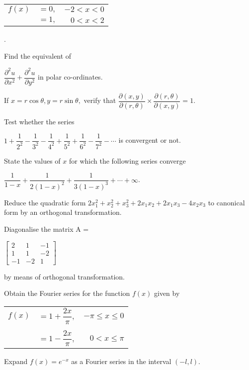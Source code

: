   \begin{tabular}{l@{} @{}c @{}  r}
    $f(x)$ & $= 0,$ & $-2<x<0$\\
    & $= 1,$ & $0<x<2$
  \end{tabular}.

\markB

\newpage \again 

\partCo

\item \iitem Find the equivalent of

\hspace{1cm}  $\dfrac{\partial^2u}{\partial x^2} + \dfrac{\partial^2u}{\partial y^2}$ in polar co-ordinates.
\Or
\item
  If $ x = r \cos \theta, y = r \sin \theta,$ verify that $\dfrac{\partial(x,y)}{\partial(r,\theta)} \times
 \dfrac{\partial(r,\theta)}{\partial(x,y)} = 1$.
\ene

\item \iitem Test whether the series

  \hspace{1cm} $1 + \dfrac{1}{2^2} - \dfrac{1}{3^2} - \dfrac{1}{4^2} + \dfrac{1}{5^2} +
  \dfrac{1}{6^2} - \dfrac{1}{7^2}
  - \cdots$ is convergent or not.
\Or
\item State the values of $x$ for which the following series converge

\hspace{1cm} $\dfrac{1}{1-x} + \dfrac{1}{2(1-x)^2} + \dfrac{1}{3(1-x)^3} + \cdots + \infty$.
\ene

\item \iitem Reduce the quadratic form $ 2x_1^2 + x_2^2  + x_3^2  + 2x_1x_2  + 2x_1x_3 -4x_2x_3$ to canonical
  form by an orthogonal transformation.
\Or
\item Diagonalise the matrix A = 

  \hspace{1cm} $\begin{bmatrix}
    2 & 1 & -1\\
    1 & 1 & -2\\
    -1 & -2 & 1
    \end{bmatrix}$

  by means of orthogonal transformation.
\ene

\item \iitem Obtain the Fourier series for the function $f(x)$ given by 

  \hspace{1cm} 
  \begin{tabular}{l@{} @{}c @{}  r}
    $f(x)$ & $= 1+\dfrac{2x}{\pi},$ & $-\pi\leq x\leq 0$\\\\
    & $= 1-\dfrac{2x}{\pi},$ & $0<x\leq\pi$
  \end{tabular}
\Or
\item Expand $f(x) = e^{-x}$ as a Fourier series in the interval $(-l,l)$.
\ene

\markC
\ene

